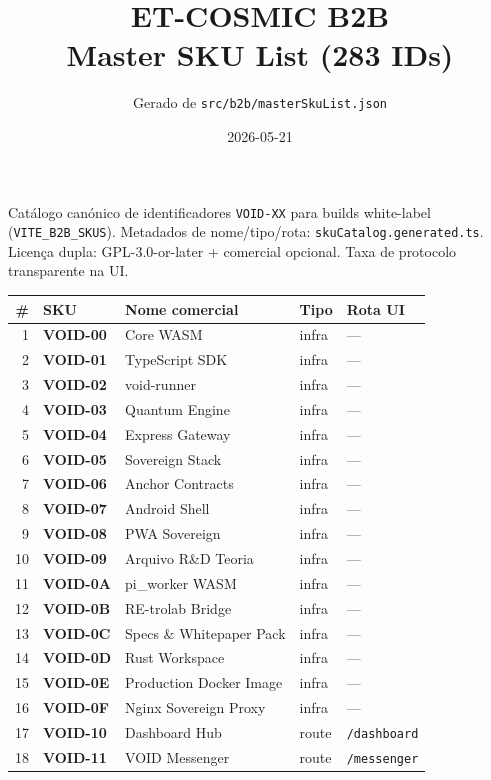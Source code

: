 \documentclass[10pt,a4paper,landscape]{article}
\title{\textbf{ET-COSMIC B2B}\\Master SKU List (283 IDs)}
\author{Gerado de \texttt{src/b2b/masterSkuList.json}}
\date{2026-05-21}
\begin{document}
\maketitle
\thispagestyle{empty}
\vspace{0.5cm}

\noindent
Catálogo canónico de identificadores \texttt{VOID-XX} para builds white-label (\texttt{VITE\_B2B\_SKUS}).
Metadados de nome/tipo/rota: \texttt{skuCatalog.generated.ts}.\\
Licença dupla: GPL-3.0-or-later + comercial opcional. Taxa de protocolo transparente na UI.

\vspace{0.5cm}
\begin{longtable}{@{}rl p{4.2cm} p{1.4cm} p{3.8cm}@{}}
\toprule
\# & SKU & Nome comercial & Tipo & Rota UI \\
\midrule
\endhead
1 & \textbf{VOID-00} & Core WASM & infra & — \\
2 & \textbf{VOID-01} & TypeScript SDK & infra & — \\
3 & \textbf{VOID-02} & void-runner & infra & — \\
4 & \textbf{VOID-03} & Quantum Engine & infra & — \\
5 & \textbf{VOID-04} & Express Gateway & infra & — \\
6 & \textbf{VOID-05} & Sovereign Stack & infra & — \\
7 & \textbf{VOID-06} & Anchor Contracts & infra & — \\
8 & \textbf{VOID-07} & Android Shell & infra & — \\
9 & \textbf{VOID-08} & PWA Sovereign & infra & — \\
10 & \textbf{VOID-09} & Arquivo R\&D Teoria & infra & — \\
11 & \textbf{VOID-0A} & pi\_worker WASM & infra & — \\
12 & \textbf{VOID-0B} & RE-trolab Bridge & infra & — \\
13 & \textbf{VOID-0C} & Specs \& Whitepaper Pack & infra & — \\
14 & \textbf{VOID-0D} & Rust Workspace & infra & — \\
15 & \textbf{VOID-0E} & Production Docker Image & infra & — \\
16 & \textbf{VOID-0F} & Nginx Sovereign Proxy & infra & — \\
17 & \textbf{VOID-10} & Dashboard Hub & route & \texttt{/dashboard} \\
18 & \textbf{VOID-11} & VOID Messenger & route & \texttt{/messenger} \\

\end{longtable}
\end{document}
